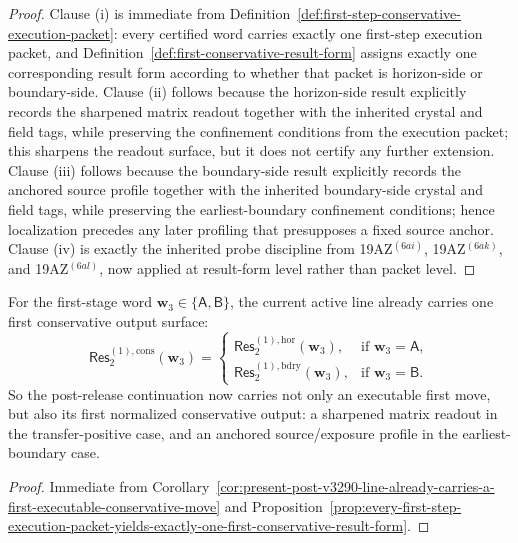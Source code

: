 \begin{proof}
Clause (i) is immediate from Definition~\ref{def:first-step-conservative-execution-packet}: every certified word carries exactly one first-step execution packet, and Definition~\ref{def:first-conservative-result-form} assigns exactly one corresponding result form according to whether that packet is horizon-side or boundary-side. Clause (ii) follows because the horizon-side result explicitly records the sharpened matrix readout together with the inherited crystal and field tags, while preserving the confinement conditions from the execution packet; this sharpens the readout surface, but it does not certify any further extension. Clause (iii) follows because the boundary-side result explicitly records the anchored source profile together with the inherited boundary-side crystal and field tags, while preserving the earliest-boundary confinement conditions; hence localization precedes any later profiling that presupposes a fixed source anchor. Clause (iv) is exactly the inherited probe discipline from 19AZ$^{(6ai)}$, 19AZ$^{(6ak)}$, and 19AZ$^{(6al)}$, now applied at result-form level rather than packet level.
\end{proof}

\begin{corollary}
\label{cor:present-post-v3290-line-already-carries-a-first-conservative-output-surface}
For the first-stage word \(\mathbf w_3\in\{\mathsf A,\mathsf B\}\), the current active line already carries one first conservative output surface:
\[
 \mathsf{Res}^{(1),\mathrm{cons}}_{2}(\mathbf w_3)
 =
 \begin{cases}
 \mathsf{Res}^{(1),\mathrm{hor}}_{2}(\mathbf w_3), & \text{if }\mathbf w_3=\mathsf A,\\[2mm]
 \mathsf{Res}^{(1),\mathrm{bdry}}_{2}(\mathbf w_3), & \text{if }\mathbf w_3=\mathsf B.
 \end{cases}
\]
So the post-release continuation now carries not only an executable first move, but also its first normalized conservative output: a sharpened matrix readout in the transfer-positive case, and an anchored source/exposure profile in the earliest-boundary case.
\end{corollary}

\begin{proof}
Immediate from Corollary~\ref{cor:present-post-v3290-line-already-carries-a-first-executable-conservative-move} and Proposition~\ref{prop:every-first-step-execution-packet-yields-exactly-one-first-conservative-result-form}.
\end{proof}

